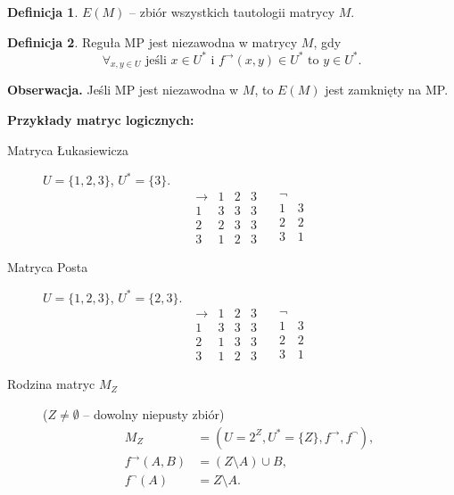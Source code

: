 \documentclass[10pt,a4paper]{article}
\theoremstyle{plain}
\theoremstyle{definition}
\newtheorem*{definition}{Definicja}
\newcommand{\impl}{\rightarrow}
\newcommand{\header}[1]{\noindent\textbf{#1}}
\begin{document}
\begin{definition}
$E(M)$ -- zbiór wszystkich tautologii matrycy $M$.
\end{definition}

\begin{definition}
Reguła MP jest niezawodna w matrycy $M$, gdy
$$\forall_{x,y \in U}
  \text{ jeśli } x \in U^* \text{ i } f^\impl(x,y) \in U^*
  \text{ to } y \in U^*.$$
\end{definition}

\header{Obserwacja.} Jeśli MP jest niezawodna w $M$,
to $E(M)$ jest zamknięty na MP.

\bigskip

\header{Przykłady matryc logicznych:}

\begin{description}
  \item[Matryca Łukasiewicza]
    $U = \{1, 2, 3\}$, $U^* = \{3\}.$
    $$\begin{array}{r|lll}
      \impl & 1 & 2 & 3\\
      \hline
          1 & 3 & 3 & 3\\
          2 & 2 & 3 & 3\\
          3 & 1 & 2 & 3
    \end{array}\quad\begin{array}{r|l}
      \neg & \\
      \hline
         1 & 3\\
         2 & 2\\
         3 & 1
    \end{array}$$

  \item[Matryca Posta]
    $U = \{1, 2, 3\}$, $U^* = \{2, 3\}.$
    $$\begin{array}{r|lll}
      \impl & 1 & 2 & 3\\
      \hline
          1 & 3 & 3 & 3\\
          2 & 1 & 3 & 3\\
          3 & 1 & 2 & 3
    \end{array}\quad\begin{array}{r|l}
      \neg & \\
      \hline
         1 & 3\\
         2 & 2\\
         3 & 1
    \end{array}$$

  \item[Rodzina matryc $M_Z$]
    ($Z \neq \emptyset$ -- dowolny niepusty zbiór)
    \begin{align*}
      M_Z &= (U = 2^Z, U^* = \{Z\}, f^\impl, f^\neg),\\
      f^\impl (A, B) &= (Z \setminus A) \cup B,\\
      f^\neg (A) &= Z \setminus A.
    \end{align*}
\end{description}
\end{document}

